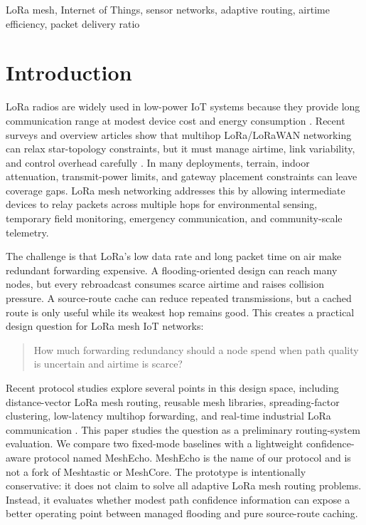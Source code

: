 \documentclass[conference]{IEEEtran}
\begin{document}
\begin{IEEEkeywords}
LoRa mesh, Internet of Things, sensor networks, adaptive routing, airtime efficiency, packet delivery ratio
\end{IEEEkeywords}

\section{Introduction}

LoRa radios are widely used in low-power IoT systems because they provide long
communication range at modest device cost and energy consumption
\cite{augustin2016study}. Recent surveys and overview articles show that
multihop LoRa/LoRaWAN networking can relax star-topology constraints, but it
must manage airtime, link variability, and control overhead carefully
\cite{wong2024multihop,cotrim2020lorawanmesh,osorio2020routing,centelles2021beyond}.
In many deployments, terrain, indoor attenuation, transmit-power limits, and
gateway placement constraints can leave coverage gaps. LoRa mesh networking
addresses this by allowing intermediate devices to relay packets across
multiple hops for environmental sensing, temporary field monitoring, emergency
communication, and community-scale telemetry.

The challenge is that LoRa's low data rate and long packet time on air make
redundant forwarding expensive. A flooding-oriented design can reach many
nodes, but every rebroadcast consumes scarce airtime and raises collision
pressure. A source-route cache can reduce repeated transmissions, but a cached
route is only useful while its weakest hop remains good. This creates a
practical design question for LoRa mesh IoT networks:

\begin{quote}
How much forwarding redundancy should a node spend when path quality is
uncertain and airtime is scarce?
\end{quote}

Recent protocol studies explore several points in this design space, including
distance-vector LoRa mesh routing, reusable mesh libraries, spreading-factor
clustering, low-latency multihop forwarding, and real-time industrial LoRa
communication
\cite{pueyo2024minimalistic,sole2022implementation,zhu2019improving,ahmar2022smarthop,leonardi2023mrt}.
This paper studies the question as a preliminary routing-system evaluation. We
compare two fixed-mode baselines with a lightweight confidence-aware protocol
named MeshEcho. MeshEcho is the name of our protocol and is not a fork of
Meshtastic or MeshCore. The prototype is intentionally conservative: it does
not claim to solve all adaptive LoRa mesh routing problems. Instead, it
evaluates whether modest path confidence information can expose a better
operating point between managed flooding and pure source-route caching.
\end{document}
